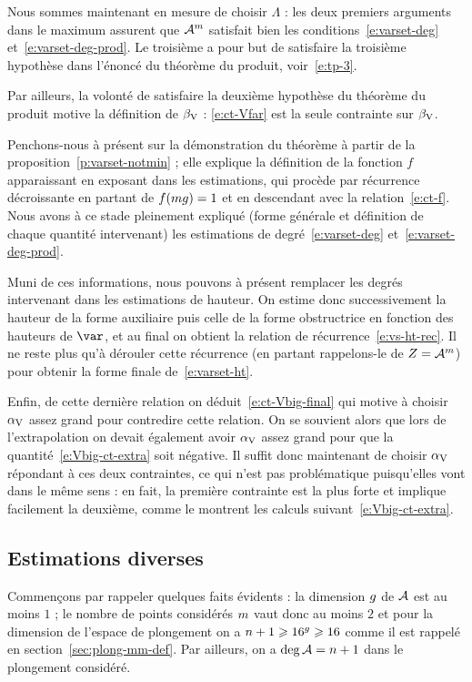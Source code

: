 Nous sommes maintenant en mesure de choisir \( \Lambda \) : les deux premiers
arguments dans le maximum assurent que \( \mathcal A^m \) satisfait bien les
conditions~\eqref{e:varset-deg} et~\eqref{e:varset-deg-prod}. Le troisième a
pour but de satisfaire la troisième hypothèse dans l'énoncé du théorème du
produit, voir~\eqref{e:tp-3}.

Par ailleurs, la volonté de satisfaire la deuxième hypothèse du théorème du
produit motive la définition de \( \beta \sb{\mathrm{V}} \) : \eqref{e:ct-Vfar} est la seule
contrainte sur \( \beta \sb{\mathrm{V}} \).

Penchons-nous à présent sur la démonstration du théorème à partir de la
proposition~\ref{p:varset-notmin} ; elle explique la définition de la fonction
\( f \) apparaissant en exposant dans les estimations, qui procède par
récurrence décroissante en partant de \( f(mg) = 1 \) et en
descendant avec la relation~\eqref{e:ct-f}. Nous avons à ce stade pleinement
expliqué (forme générale et définition de chaque quantité intervenant) les
estimations de degré~\eqref{e:varset-deg} et~\eqref{e:varset-deg-prod}.

Muni de ces informations, nous pouvons à présent remplacer les degrés
intervenant dans les estimations de hauteur. On estime donc successivement la
hauteur de la forme auxiliaire puis celle de la forme obstructrice en fonction
des hauteurs de \( \var \), et au final on obtient la relation de
récurrence~\eqref{e:vs-ht-rec}. Il ne reste plus qu'à dérouler cette
récurrence (en partant rappelons-le de \( Z = \mathcal A^m \)) pour obtenir la
forme finale de~\eqref{e:varset-ht}.

Enfin, de cette dernière relation on déduit~\eqref{e:ct-Vbig-final} qui
motive à choisir \( \alpha \sb{\mathrm{V}} \) assez grand pour contredire cette relation. On se
souvient alors que lors de l'extrapolation on devait également avoir \( \alpha \sb{\mathrm{V}}
\) assez grand pour que la quantité~\eqref{e:Vbig-ct-extra} soit négative.
Il suffit donc maintenant de choisir \( \alpha \sb{\mathrm{V}} \) répondant à ces deux
contraintes, ce qui n'est pas problématique puisqu'elles vont dans le même
sens : en fait, la première contrainte est la plus forte et implique
facilement la deuxième, comme le montrent les calculs
suivant~\eqref{e:Vbig-ct-extra}.


\subsection{Estimations diverses}

Commençons par rappeler quelques faits évidents : la dimension \( g \) de
\( \mathcal A \) est au moins \( 1 \) ; le nombre de points considérés \( m \)
vaut donc au moins \( 2 \) et pour la dimension de l'espace de plongement on a
\( n + 1 \geqslant 16^g \geqslant 16 \) comme il est rappelé en
section~\ref{sec:plong-mm-def}. Par ailleurs, \todo[référence] on a \( \deg
  \mathcal A = n + 1 \) dans le plongement considéré.

